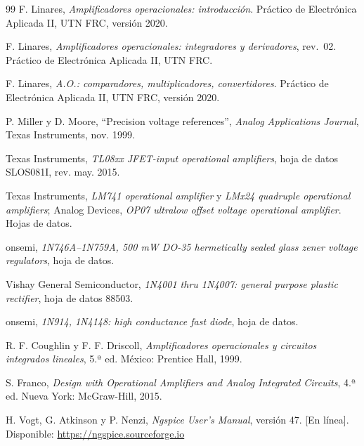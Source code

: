 \documentclass{plantilla}
\begin{document}
\begin{thebibliography}{99}
F. Linares, \emph{Amplificadores operacionales: introducción}. Práctico de Electrónica Aplicada II, UTN FRC, versión 2020.

F. Linares, \emph{Amplificadores operacionales: integradores y derivadores}, rev.~02. Práctico de Electrónica Aplicada II, UTN FRC.

F. Linares, \emph{A.O.: comparadores, multiplicadores, convertidores}. Práctico de Electrónica Aplicada II, UTN FRC, versión 2020.

P. Miller y D. Moore, ``Precision voltage references'', \emph{Analog Applications Journal}, Texas Instruments, nov. 1999.

Texas Instruments, \emph{TL08xx JFET-input operational amplifiers}, hoja de datos SLOS081I, rev. may. 2015.

Texas Instruments, \emph{LM741 operational amplifier} y \emph{LMx24 quadruple operational amplifiers}; Analog Devices, \emph{OP07 ultralow offset voltage operational amplifier}. Hojas de datos.

onsemi, \emph{1N746A--1N759A, 500 mW DO-35 hermetically sealed glass zener voltage regulators}, hoja de datos.

Vishay General Semiconductor, \emph{1N4001 thru 1N4007: general purpose plastic rectifier}, hoja de datos 88503.

onsemi, \emph{1N914, 1N4148: high conductance fast diode}, hoja de datos.

R. F. Coughlin y F. F. Driscoll, \emph{Amplificadores operacionales y circuitos integrados lineales}, 5.ª ed. México: Prentice Hall, 1999.

S. Franco, \emph{Design with Operational Amplifiers and Analog Integrated Circuits}, 4.ª ed. Nueva York: McGraw-Hill, 2015.

H. Vogt, G. Atkinson y P. Nenzi, \emph{Ngspice User's Manual}, versión 47. [En línea]. Disponible: \url{https://ngspice.sourceforge.io}
\end{thebibliography}
\end{document}
